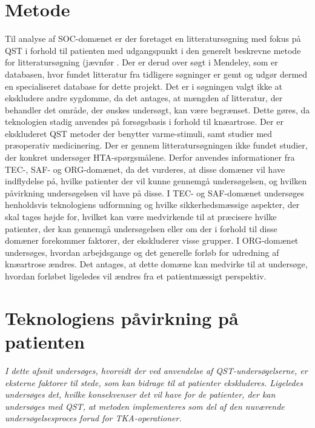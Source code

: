 \section{Metode}
Til analyse af SOC-domænet er der foretaget en litteratursøgning med fokus på QST i forhold til patienten med udgangspunkt i den generelt beskrevne metode for litteratursøgning (jævnfør . Der er derud over søgt i Mendeley, som er databasen, hvor fundet litteratur fra tidligere søgninger er gemt og udgør dermed en specialiseret database for dette projekt.  Det er i søgningen valgt ikke at ekskludere andre sygdomme, da det antages, at mængden af litteratur, der behandler det område, der ønskes undersøgt, kan være begrænset. Dette gøres, da teknologien stadig anvendes på forsøgsbasis i forhold til knæartrose. Der er ekskluderet QST metoder der benytter varme-stimuli, samt studier med præoperativ medicinering. Der er gennem litteratursøgningen ikke fundet studier, der konkret undersøger HTA-spørgsmålene. Derfor anvendes informationer fra TEC-, SAF- og ORG-domænet, da det vurderes, at disse domæner vil have indflydelse på, hvilke patienter der vil kunne gennemgå undersøgelsen, og hvilken påvirkning undersøgelsen vil have på disse. I TEC- og SAF-domænet undersøges henholdsvis teknologiens udformning og hvilke sikkerhedsmæssige aspekter, der skal tages højde for, hvilket kan være medvirkende til at præcisere hvilke patienter, der kan gennemgå undersøgelsen eller om der i forhold til disse domæner forekommer faktorer, der ekskluderer visse grupper. I ORG-domænet undersøges, hvordan arbejdsgange og det generelle forløb for udredning af knæartrose ændres. Det antages, at dette domæne kan medvirke til at undersøge, hvordan forløbet ligeledes vil ændres fra et patientmæssigt perspektiv.   
 
\section{Teknologiens påvirkning på patienten}
\textit{I dette afsnit undersøges, hvorvidt der ved anvendelse af QST-undersøgelserne, er eksterne faktorer til stede, som kan bidrage til at patienter ekskluderes. Ligeledes undersøges det, hvilke konsekvenser det vil have for de patienter, der kan undersøges med QST, at metoden implementeres som del af den nuværende undersøgelsesproces forud for TKA-operationer.}
